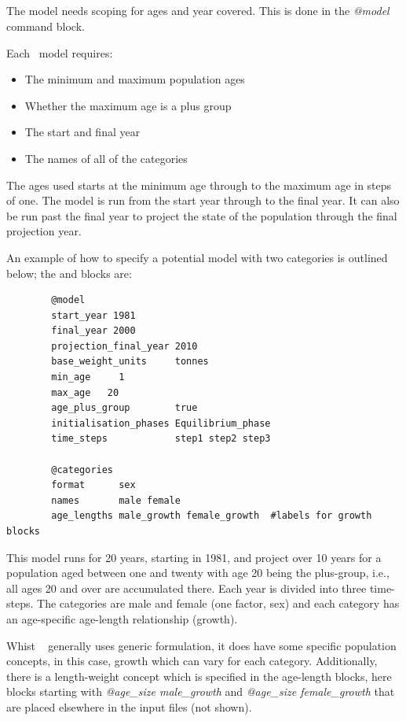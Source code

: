 \subsection{}\label{sub:sec:pop_sec}

The model needs scoping for ages and year covered. This is done in the \textit{@model} command block. 

Each \CNAME~model requires:

\begin{itemize}
\item The minimum and maximum population ages
\item Whether the maximum age is a plus group
\item The start and final year
\item The names of all of the categories
\end{itemize}

The ages used starts at the minimum age through to the maximum age in steps of one. The model is run from the start year through to the final year. It can also be run past the final year to project the state of the population through the final projection year.

An example of how to specify a potential model with two categories is outlined below;  the  and  blocks are:

{\small{\begin{verbatim}
		@model
		start_year 1981
		final_year 2000
		projection_final_year 2010
		base_weight_units     tonnes
		min_age     1
		max_age   20
		age_plus_group        true
		initialisation_phases Equilibrium_phase
		time_steps            step1 step2 step3
		
		@categories
		format      sex
		names       male female
		age_lengths male_growth female_growth  #labels for growth blocks
\end{verbatim}}}

This model runs for 20 years, starting in 1981, and project over 10 years for a population aged between one and twenty with age 20 being the plus-group, i.e., all ages 20 and over are accumulated there. Each year is divided into three time-steps. The categories are male and female (one factor, sex) and each category has an age-specific age-length relationship (growth).

Whist \CNAME~  generally uses generic formulation, it does have some specific population concepts, in this case, growth which can vary for each category. Additionally, there is a  length-weight concept which is specified in the age-length blocks, here blocks starting with \textit{@age\_size male\_growth} and \textit{@age\_size female\_growth} that are placed elsewhere in the input files (not shown). 
 
